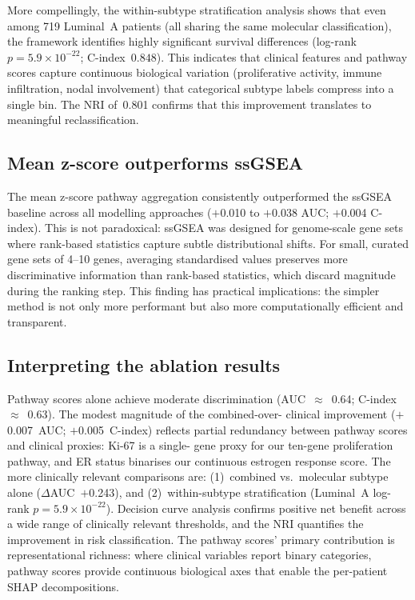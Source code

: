 \documentclass[review,12pt]{elsarticle}
\begin{document}
More compellingly, the within-subtype stratification analysis shows that
even among 719 Luminal~A patients (all sharing the same molecular
classification), the framework identifies highly significant survival
differences (log-rank $p = 5.9 \times 10^{-22}$; C-index~$0.848$).
This indicates that clinical features and pathway scores capture
continuous biological variation (proliferative activity,
immune infiltration, nodal involvement) that categorical subtype labels
compress into a single bin.  The NRI of~0.801 confirms that this
improvement translates to meaningful reclassification.

\subsection{Mean z-score outperforms ssGSEA}
\label{sec:disc_ssgsea}

The mean z-score pathway aggregation consistently outperformed the
ssGSEA baseline across all modelling approaches ($+$0.010 to $+$0.038
AUC; $+$0.004 C-index).  This is not paradoxical: ssGSEA was designed for
genome-scale gene sets where rank-based statistics capture subtle
distributional shifts.  For small, curated gene sets of 4--10 genes,
averaging standardised values preserves more discriminative information
than rank-based statistics, which discard magnitude during the ranking
step.  This finding has practical implications: the simpler method is not
only more performant but also more computationally efficient and
transparent.

\subsection{Interpreting the ablation results}
\label{sec:disc_ablation}

Pathway scores alone achieve moderate discrimination (AUC~$\approx$~0.64;
C-index~$\approx$~0.63).  The modest magnitude of the combined-over-
clinical improvement ($+$0.007~AUC; $+$0.005~C-index) reflects partial
redundancy between pathway scores and clinical proxies: Ki-67 is a single-
gene proxy for our ten-gene proliferation pathway, and ER status
binarises our continuous estrogen response score.  The more clinically
relevant comparisons are: (1)~combined vs.\ molecular subtype alone
($\Delta$AUC~$+$0.243), and (2)~within-subtype stratification
(Luminal~A log-rank $p = 5.9 \times 10^{-22}$).  Decision curve analysis
confirms positive net benefit across a wide range of clinically relevant
thresholds, and the NRI quantifies the improvement in risk
classification.  The pathway scores' primary contribution is
representational richness: where clinical variables report binary
categories, pathway scores provide continuous biological axes that
enable the per-patient SHAP decompositions.
\end{document}
